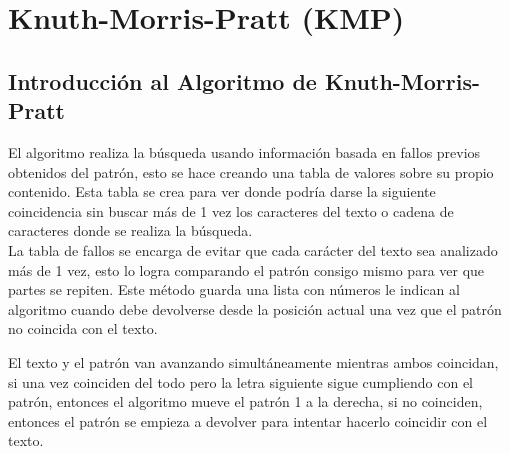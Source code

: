 \section*{Knuth-Morris-Pratt (KMP)}
{}

\subsection*{Introducción al Algoritmo de Knuth-Morris-Pratt}
\quad El algoritmo realiza la búsqueda usando información basada en fallos previos obtenidos del patrón, esto se hace creando una tabla de valores sobre su propio contenido. Esta tabla se crea para ver donde podría darse la siguiente coincidencia sin buscar más de 1 vez los caracteres del texto o cadena de caracteres donde se realiza la búsqueda.
\\
\quad La tabla de fallos se encarga de evitar que cada carácter del texto sea analizado más de 1 vez, esto lo logra comparando el patrón consigo mismo para ver que partes se repiten. Este método guarda una lista con números le indican al algoritmo cuando debe devolverse desde la posición actual una vez que el patrón no coincida con el texto.

\quad El texto y el patrón van avanzando simultáneamente mientras ambos coincidan, si una vez coinciden del todo pero la letra siguiente sigue cumpliendo con el patrón, entonces el algoritmo mueve el patrón 1 a la derecha, si no coinciden, entonces el patrón se empieza a devolver para intentar hacerlo coincidir con el texto.

